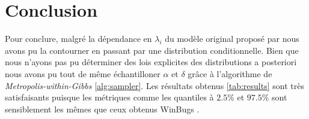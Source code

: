 \section{Conclusion}

Pour conclure, malgré la dépendance en $\lambda_i$ du modèle original proposé par \cite{Farewell1988} nous avons pu la contourner en passant par une distribution conditionnelle.
Bien que nous n'ayons pas pu déterminer des lois explicites des distributions a posteriori nous avons pu tout de même échantilloner $\alpha$ et $\delta$ grâce à l'algorithme de \textit{Metropolis-within-Gibbs} \ref{alg:sampler}.
Les résultats obtenus \ref{tab:results} sont très satisfaisants puisque les métriques comme les quantiles à $2.5\%$ et $97.5\%$ sont sensiblement les mêmes que ceux obtenus WinBugs \cite{winbugs_hearts}.